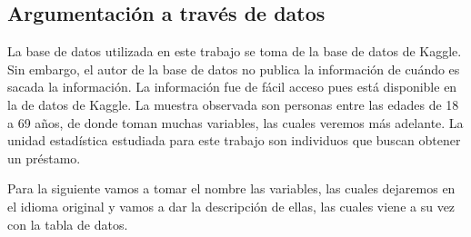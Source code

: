 \documentclass[
  letterpaper,
  DIV=11,
  numbers=noendperiod]{scrreprt}
\begin{document}
\subsection{Argumentación a través de
datos}\label{argumentaciuxf3n-a-travuxe9s-de-datos}

La base de datos utilizada en este trabajo se toma de la base de datos
de Kaggle. Sin embargo, el autor de la base de datos no publica la
información de cuándo es sacada la información. La información fue de
fácil acceso pues está disponible en la de datos de Kaggle. La muestra
observada son personas entre las edades de 18 a 69 años, de donde toman
muchas variables, las cuales veremos más adelante. La unidad estadística
estudiada para este trabajo son individuos que buscan obtener un
préstamo.

Para la siguiente vamos a tomar el nombre las variables, las cuales
dejaremos en el idioma original y vamos a dar la descripción de ellas,
las cuales viene a su vez con la tabla de datos.
\end{document}
